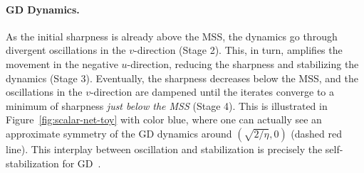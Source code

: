 \paragraph{GD Dynamics.}
As the initial sharpness is already above the MSS, the dynamics go through divergent oscillations in the $v$-direction (Stage 2).
This, in turn, amplifies the movement in the negative $u$-direction, reducing the sharpness and stabilizing the dynamics (Stage 3).
Eventually, the sharpness decreases below the MSS, and the oscillations in the $v$-direction are dampened until the iterates converge to a minimum of sharpness {\it just below the MSS} (Stage 4).
This is illustrated in Figure~\ref{fig:scalar-net-toy} with color {\color{blue} blue}, where one can actually see an approximate symmetry of the {\color{blue} GD} dynamics around $(\sqrt{2/\eta}, 0)$ (dashed {\color{red}red} line).
This interplay between oscillation and stabilization is precisely the self-stabilization for GD~\citep{damian2023stabilization}.




